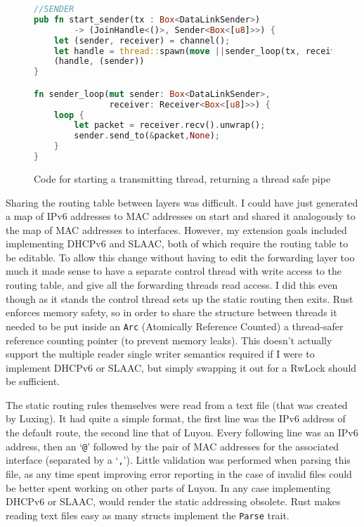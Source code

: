 \documentclass[12pt,a4paper,twoside,openright]{report}
\begin{document}
\begin{figure}
\centering
\begin{varwidth}{\linewidth}
\begin{lstlisting}[language=Rust]
//SENDER
pub fn start_sender(tx : Box<DataLinkSender>) 
 		-> (JoinHandle<()>, Sender<Box<[u8]>>) {
    let (sender, receiver) = channel();
    let handle = thread::spawn(move ||sender_loop(tx, receiver));
    (handle, (sender))
}

fn sender_loop(mut sender: Box<DataLinkSender>, 
			   receiver: Receiver<Box<[u8]>>) {
    loop {
        let packet = receiver.recv().unwrap();
        sender.send_to(&packet,None);
    }
}
\end{lstlisting}
\end{varwidth}
\caption{Code for starting a transmitting thread, returning a thread safe pipe}
\label{fig::sending}
\end{figure}

\bigskip

Sharing the routing table between layers was difficult.  I could have just generated a map of IPv6 addresses to MAC addresses on start and shared it analogously to the map of MAC addresses to interfaces. However, my extension goals included implementing DHCPv6 and SLAAC, both of which require the routing table to be editable.  To allow this change without having to edit the forwarding layer too much it made sense to have a separate control thread with write access to the routing table, and give all the forwarding threads read access.  I did this even though as it stands the control thread sets up the static routing then exits.  Rust enforces memory safety, so in order to share the structure between threads it needed to be put inside an \verb!Arc! (Atomically Reference Counted)\cite{rust_arc} a thread-safer reference counting pointer (to prevent memory leaks).  This doesn't actually support the multiple reader single writer semantics required if I were to implement DHCPv6 or SLAAC, but simply swapping it out for a RwLock\cite{rust_rwlock} should be sufficient.

\bigskip

The static routing rules themselves were read from a text file (that was created by Luxing). It had quite a simple format, the first line was the IPv6 address of the default route, the second line that of Luyou.  Every following line was an IPv6 address, then an `\verb!@!' followed by the pair of MAC addresses for the associated interface (separated by a `\verb!,!').  Little validation was performed when parsing this file, as any time spent improving error reporting in the case of invalid files could be better spent working on other parts of Luyou.  In any case implementing DHCPv6 or SLAAC, would render the static addressing obsolete. Rust makes reading text files easy as many structs implement the \verb!Parse! trait.
\end{document}
